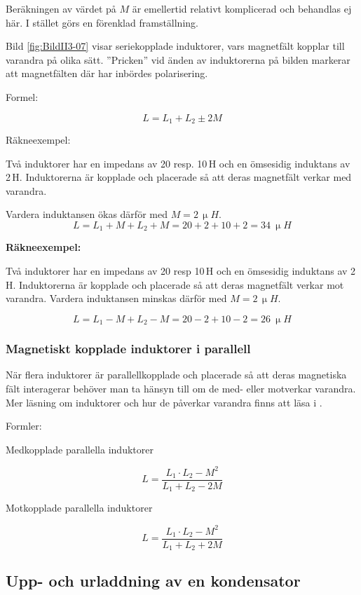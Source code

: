 Beräkningen av värdet på \(M\) är emellertid relativt komplicerad och behandlas
ej här.
I stället görs en förenklad framställning.

Bild \ref{fig:BildII3-07} visar seriekopplade induktorer, vars magnetfält
kopplar till varandra på olika sätt.
''Pricken'' vid änden av induktorerna på bilden markerar att magnetfälten där
har inbördes polarisering.

\noindent Formel:

\[L = L_1 +L_2 \pm 2M\]

\noindent Räkneexempel:

Två induktorer har en impedans av 20 resp. 10\,\textmu H och en ömsesidig
induktans av 2\,\textmu H.
Induktorerna är kopplade och placerade så att deras magnetfält verkar med
varandra.

Vardera induktansen ökas därför med \(M = 2\,\unit{\upmu H}\).
\[
L = L_1 + M + L_2 + M 
  = 20 + 2 + 10 + 2 
  = \SI{34}{\upmu H}
\]

\noindent \textbf{Räkneexempel:}

Två induktorer har en impedans av 20 resp 10\,\textmu H och en ömsesidig
induktans av 2\,\textmu H.
Induktorerna är kopplade och placerade så att deras magnetfält verkar mot
varandra.
Vardera induktansen minskas därför med \(M = 2\,\unit{\upmu H}\).

\[
L = L_1 - M + L_2 - M 
  = 20 - 2 + 10 - 2
  = \SI{26}{\upmu H}
\]
  
\subsubsection{Magnetiskt kopplade induktorer i parallell}
När flera induktorer är parallellkopplade och placerade så att deras magnetiska
fält interagerar behöver man ta hänsyn till om de med- eller motverkar varandra.
Mer läsning om induktorer och hur de påverkar varandra finns att läsa i
\cite{letrafo}.

\noindent Formler:

Medkopplade parallella induktorer

\[L = \frac{L_1 \cdot L_2 - M^2}{L_1 + L_2 - 2M}\]

Motkopplade parallella induktorer

\[L = \frac{L_1 \cdot L_2 - M^2}{L_1 + L_2 + 2M}\]

\subsection{Upp- och urladdning av en kondensator}

